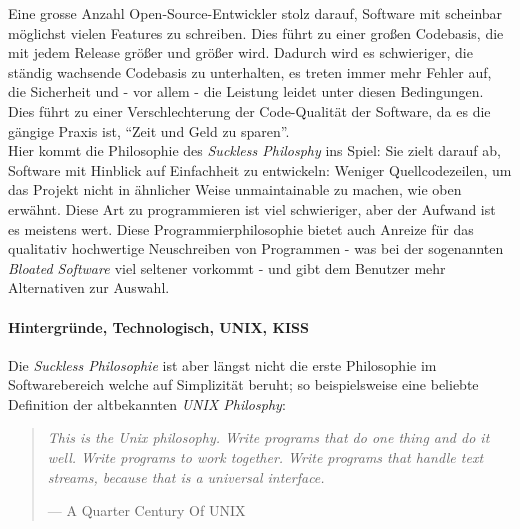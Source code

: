 \documentclass[a4paper,11pt]{article}
\newenvironment{nicequote}[2]{
    \begin{center}\begin{quote}\textit{#1}\\\par\raggedleft--- {#2}
    }{
    \end{quote}\end{center}
}
\begin{document}
Eine grosse Anzahl Open-Source-Entwickler stolz darauf, Software mit scheinbar möglichst vielen Features zu schreiben. Dies führt zu einer großen Codebasis, die mit jedem Release größer und größer wird. Dadurch wird es schwieriger, die ständig wachsende Codebasis zu unterhalten, es treten immer mehr Fehler auf, die Sicherheit und - vor allem - die Leistung leidet unter diesen Bedingungen. Dies führt zu einer Verschlechterung der Code-Qualität der Software, da es die gängige Praxis ist, ``Zeit und Geld zu sparen''. \cite{bhattacharya2020}\\



Hier kommt die Philosophie des \textit{Suckless Philosphy} ins Spiel: Sie zielt darauf ab, Software mit Hinblick auf Einfachheit zu entwickeln: Weniger Quellcodezeilen, um das Projekt nicht in ähnlicher Weise unmaintainable zu machen, wie oben erwähnt. Diese Art zu programmieren ist viel schwieriger, aber der Aufwand ist es meistens wert. Diese Programmierphilosophie bietet auch Anreize für das qualitativ hochwertige Neuschreiben von Programmen - was bei der sogenannten \textit{Bloated Software \cite{bhattacharya2020}} viel seltener vorkommt - und gibt dem Benutzer mehr Alternativen zur Auswahl.

\paragraph{Hintergründe, Technologisch, UNIX, KISS}
Die \textit{Suckless Philosophie} ist aber längst nicht die erste Philosophie im Softwarebereich welche auf Simplizität beruht; so beispielsweise eine beliebte Definition der altbekannten \textit{UNIX Philosphy}:

\begin{nicequote}{This is the Unix philosophy. Write programs that do one thing and do it well. Write programs to work together. Write programs that handle text streams, because that is a universal interface.}{A Quarter Century Of UNIX \cite{salus1994}}
\end{nicequote}
\end{document}
